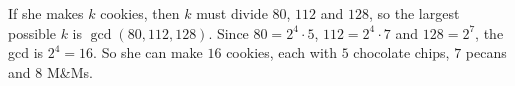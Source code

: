 If she makes $k$ cookies, then $k$ must divide $80$, $112$ and $128$, so the largest possible $k$ is $\gcd(80,112,128)$. Since $80=2^4\cdot5$, $112=2^4\cdot7$ and $128=2^7$, the gcd is $2^4=16$. So she can make $\boxed{16}$ cookies, each with $5$ chocolate chips, $7$ pecans and $8$ M\&Ms.
